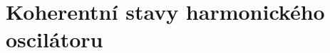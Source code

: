 \section{Koherentní stavy harmonického oscilátoru}
\label{sec:CoherentStates}

\begin{theory}

\end{theory}







%
